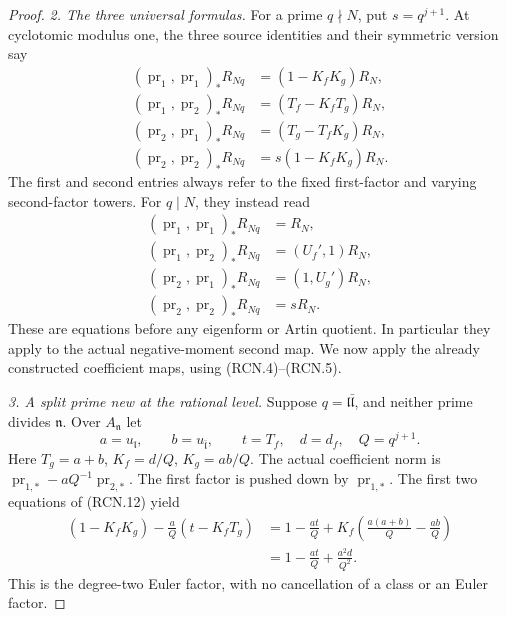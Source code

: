 \begin{proof}
\emph{2. The three universal formulas.}
For a prime \(q\nmid N\), put \(s=q^{j+1}\).
At cyclotomic modulus one, the three source identities
and their symmetric version say
\[
\begin{split}
 (\operatorname{pr}_1,\operatorname{pr}_1)_*R_{Nq}
     &=(1-K_fK_g)R_N,\\
 (\operatorname{pr}_1,\operatorname{pr}_2)_*R_{Nq}
     &=(T_f-K_fT_g)R_N,\\
 (\operatorname{pr}_2,\operatorname{pr}_1)_*R_{Nq}
     &=(T_g-T_fK_g)R_N,\\
 (\operatorname{pr}_2,\operatorname{pr}_2)_*R_{Nq}
     &=s(1-K_fK_g)R_N .
\end{split}
 \tag{RCN.12}
\]
The first and second entries always refer to the fixed
first-factor and varying second-factor towers.
For \(q\mid N\), they instead read
\[
\begin{split}
 (\operatorname{pr}_1,\operatorname{pr}_1)_*R_{Nq}&=R_N,\\
 (\operatorname{pr}_1,\operatorname{pr}_2)_*R_{Nq}&=(U_f',1)R_N,\\
 (\operatorname{pr}_2,\operatorname{pr}_1)_*R_{Nq}&=(1,U_g')R_N,\\
 (\operatorname{pr}_2,\operatorname{pr}_2)_*R_{Nq}&=sR_N .
\end{split}
 \tag{RCN.13}
\]
These are equations before any eigenform or Artin quotient.
In particular they apply to the actual negative-moment
second map.  We now apply the already constructed
coefficient maps, using (RCN.4)--(RCN.5).

\emph{3. A split prime new at the rational level.}
Suppose \(q=\mathfrak l\bar{\mathfrak l}\), and neither
prime divides \(\mathfrak n\).
Over \(A_{\mathfrak n}\) let
\[
 a=u_{\mathfrak l},\qquad b=u_{\bar{\mathfrak l}},\qquad
 t=T_f,\quad d=d_f,\quad Q=q^{j+1}.
\]
Here \(T_g=a+b\), \(K_f=d/Q\), \(K_g=ab/Q\).
The actual coefficient norm is
\(\operatorname{pr}_{1,*}-aQ^{-1}\operatorname{pr}_{2,*}\).
The first factor is pushed down by \(\operatorname{pr}_{1,*}\).
The first two equations of (RCN.12) yield
\[
\begin{split}
 (1-K_fK_g)-\frac aQ(t-K_fT_g)
 &=1-\frac{at}{Q}
       +K_f\left(\frac{a(a+b)}Q-\frac{ab}Q\right)\\
 &=1-\frac{at}{Q}+\frac{a^2d}{Q^2}.
\end{split}
 \tag{RCN.14}
\]
This is the degree-two Euler factor, with no cancellation
of a class or an Euler factor.


\end{proof}
